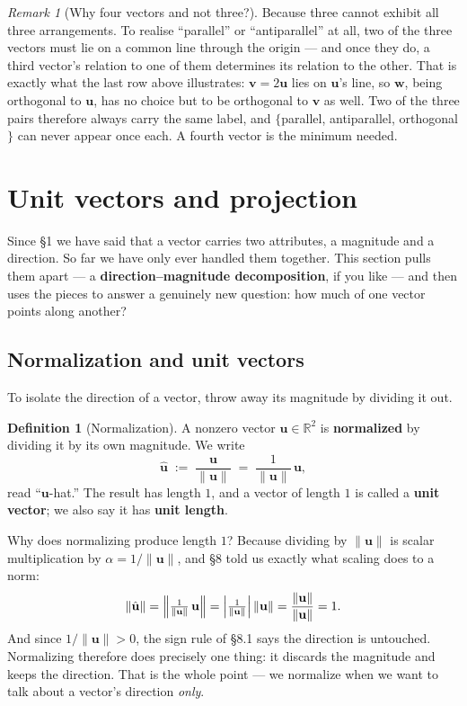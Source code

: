 \documentclass[11pt]{article}
\theoremstyle{definition}
\newtheorem{defn}{Definition}[section]
\theoremstyle{remark}
\newtheorem*{rmk}{Remark}
\newcommand{\R}{\mathbb{R}}
\newcommand{\vc}[1]{\mathbf{#1}}
\newcommand{\norm}[1]{\lVert #1\rVert}
\newcommand{\uv}[1]{\hat{\vc{#1}}}                 %
\begin{document}
\begin{rmk}[Why four vectors and not three?]
Because three cannot exhibit all three arrangements. To realise ``parallel'' or
``antiparallel'' at all, two of the three vectors must lie on a common line
through the origin --- and once they do, a third vector's relation to one of
them determines its relation to the other. That is exactly what the last row
above illustrates: $\vc{v}=2\vc{u}$ lies on $\vc{u}$'s line, so $\vc{w}$, being
orthogonal to $\vc{u}$, has no choice but to be orthogonal to $\vc{v}$ as well.
Two of the three pairs therefore always carry the same label, and
$\{$parallel, antiparallel, orthogonal$\}$ can never appear once each. A fourth
vector is the minimum needed.
\end{rmk}

\section{Unit vectors and projection}
Since \S1 we have said that a vector carries two attributes, a magnitude and a
direction. So far we have only ever handled them together. This section pulls
them apart --- a \textbf{direction--magnitude decomposition}, if you like ---
and then uses the pieces to answer a genuinely new question: how much of one
vector points along another?

\subsection{Normalization and unit vectors}
To isolate the direction of a vector, throw away its magnitude by dividing it
out.

\begin{defn}[Normalization]
A nonzero vector $\vc{u}\in\R^{2}$ is \textbf{normalized} by dividing it by its
own magnitude. We write
\[
  \uv{u} \;:=\; \frac{\vc{u}}{\norm{\vc{u}}}
  \;=\; \frac{1}{\norm{\vc{u}}}\,\vc{u},
\]
read ``$\vc{u}$-hat.'' The result has length $1$, and a vector of length $1$ is
called a \textbf{unit vector}; we also say it has \textbf{unit length}.
\end{defn}

\noindent Why does normalizing produce length $1$? Because dividing by
$\norm{\vc{u}}$ is scalar multiplication by $\alpha=1/\norm{\vc{u}}$, and \S8
told us exactly what scaling does to a norm:
\[
  \norm{\uv{u}}
  = \Bigl\lVert \tfrac{1}{\norm{\vc{u}}}\,\vc{u}\Bigr\rVert
  = \left\lvert \tfrac{1}{\norm{\vc{u}}}\right\rvert \norm{\vc{u}}
  = \frac{\norm{\vc{u}}}{\norm{\vc{u}}}
  = 1 .
\]
And since $1/\norm{\vc{u}}>0$, the sign rule of \S8.1 says the direction is
untouched. Normalizing therefore does precisely one thing: it discards the
magnitude and keeps the direction. That is the whole point --- we normalize when
we want to talk about a vector's direction \emph{only}.
\end{document}
